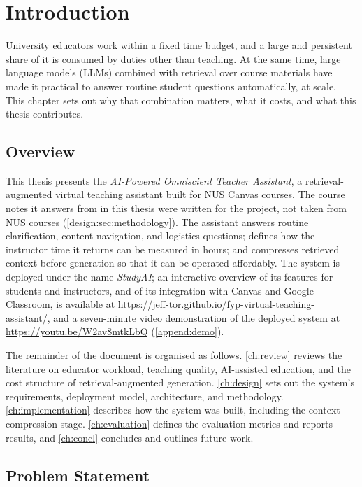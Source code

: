 \chapter{Introduction}
\label{ch:intro}
\vspace{2em}

University educators work within a fixed time budget, and a large and
persistent share of it is consumed by duties other than teaching. At the same
time, large language models (LLMs) combined with retrieval over course
materials have made it practical to answer routine student questions
automatically, at scale. This chapter sets out why that combination matters,
what it costs, and what this thesis contributes.

\section{Overview}
\label{intro:sec:overview}

This thesis presents the \emph{AI-Powered Omniscient Teacher Assistant}, a
retrieval-augmented virtual teaching assistant built for NUS Canvas courses.
The course notes it answers from in this thesis were written for the project,
not taken from NUS courses (\autoref{design:sec:methodology}). The assistant answers routine clarification, content-navigation, and
logistics questions; defines how the instructor time it returns can be
measured in hours; and compresses retrieved context before generation
so that it can be operated affordably. The system is deployed under the name
\emph{StudyAI}; an interactive overview of its features for students and
instructors, and of its integration with Canvas and Google Classroom, is
available at
\url{https://jeff-tor.github.io/fyp-virtual-teaching-assistant/}, and a
seven-minute video demonstration of the deployed system at
\url{https://youtu.be/W2av8mtkLbQ} (\autoref{append:demo}).

The remainder of the document is organised as follows.
\autoref{ch:review} reviews the literature on educator workload, teaching
quality, AI-assisted education, and the cost structure of
retrieval-augmented generation. \autoref{ch:design} sets out the system's
requirements, deployment model, architecture, and methodology.
\autoref{ch:implementation} describes how the system was built, including the
context-compression stage. \autoref{ch:evaluation} defines the evaluation
metrics and reports results, and \autoref{ch:concl} concludes and outlines
future work.

\section{Problem Statement}
\label{intro:sec:problem}

